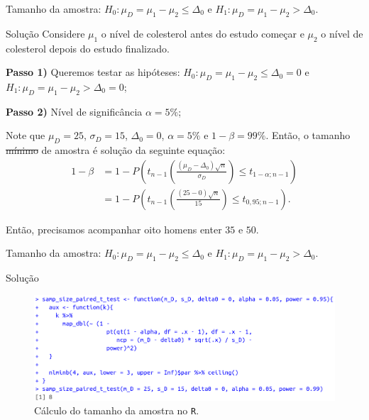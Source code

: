 \documentclass[9pt]{beamer}
\begin{document}
\begin{frame}{Tamanho da amostra: $H_0:\mu_D = \mu_1 - \mu_2 \leq \Delta_0$ e $H_1:\mu_D =  \mu_1 - \mu_2 > \Delta_0$.}

\begin{block}{Solução}
	Considere $\mu_1$ o nível de colesterol antes do estudo começar e $\mu_2$ o nível de colesterol depois do estudo finalizado.
	
	\textbf{Passo 1)} Queremos testar as hipóteses: $H_0: \mu_D = \mu_1 - \mu_2 \leq \Delta_0=0$ e $H_1:\mu_D = \mu_1 - \mu_2 > \Delta_0 = 0$;
	
	\textbf{Passo 2)} Nível de significância $\alpha=5\%$;
	
	Note que $\mu_D = 25$, $\sigma_D = 15$, $\Delta_0 = 0$, $\alpha=5\%$ e $1-\beta = 99\%$. Então, o tamanho \sout{mínimo} de amostra é solução da seguinte equação:
	\begin{align*}
	1-\beta &= 1 - P\left( t_{n-1}\left( \frac{(\mu_D - \Delta_0)\sqrt{n}}{\sigma_D} \right) \leq t_{1-\alpha;n-1} \right)\\
	&= 1 - P\left( t_{n-1}\left( \frac{(25 - 0)\sqrt{n}}{15} \right) \leq t_{0,95;n-1} \right).
	\end{align*}
	
	Então, precisamos acompanhar oito homens enter $35$ e $50$.
\end{block}

\end{frame}

\begin{frame}{Tamanho da amostra: $H_0:\mu_D = \mu_1 - \mu_2 \leq \Delta_0$ e $H_1:\mu_D =  \mu_1 - \mu_2 > \Delta_0$.}

\normalsize

\begin{block}{Solução}
	\begin{figure}[htbp]
		\centering
		\includegraphics[width=\linewidth]{figures/samp-size-paired-t-test-unilateral-h1-upper.png}
		\caption{Cálculo do tamanho da amostra no \texttt{R}.}
	\end{figure}
	
\end{block}

\end{frame}
\end{document}
